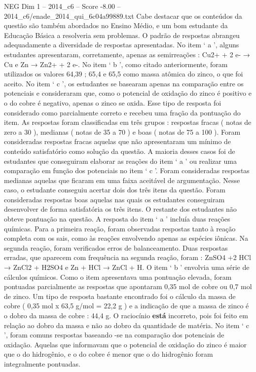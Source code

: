 \begin{textsample}{NEG Dim 1 – 2014\_c6 – Score -8.00 – 2014\_c6/enade\_2014\_qui\_6c04a99889.txt}
Cabe destacar que os conteúdos da questão são também abordados no Ensino Médio, e um bom estudante da Educação Básica a resolveria sem problemas.
O padrão de respostas abrangeu adequadamente a diversidade de respostas apresentadas.
No item ‘ a ’, alguns estudantes apresentaram, corretamente, apenas as semirreações : Cu2+ + 2 e- → Cu e Zn → Zn2+ + 2 e-.
No item ‘ b ’, como citado anteriormente, foram utilizados os valores 64,39 ; 65,4 e 65,5 como massa atômica do zinco, o que foi aceito.
No item ‘ c ’, os estudantes se basearam apenas na comparação entre os potenciais e consideraram que, como o potencial de oxidação do zinco é positivo e o do cobre é negativo, apenas o zinco se oxida.
Esse tipo de resposta foi considerado como parcialmente correto e recebeu uma fração da pontuação do item.
As respostas foram classificadas em três grupos : respostas fracas ( notas de zero a 30 ), medianas ( notas de 35 a 70 ) e boas ( notas de 75 a 100 ).
Foram consideradas respostas fracas aquelas que não apresentaram um mínimo de conteúdo satisfatório como solução da questão.
A maioria desses casos foi de estudantes que conseguiram elaborar as reações do item ‘ a ’ ou realizar uma comparação em função dos potenciais no item ‘ c ’.
Foram consideradas respostas medianas aquelas que ficaram em uma faixa aceitável de argumentação.
Nesse caso, o estudante conseguiu acertar dois dos três itens da questão.
Foram consideradas respostas boas aquelas nas quais os estudantes conseguiram desenvolver de forma satisfatória os três itens.
O restante dos estudantes não obteve pontuação na questão.
A resposta do item ‘ a ’ incluía duas reações químicas.
Para a primeira reação, foram observadas respostas tanto à reação completa com os sais, como às reações envolvendo apenas as espécies iônicas.
Na segunda reação, foram verificados erros de balanceamento.
Duas respostas erradas, que aparecem com frequência na segunda reação, foram : ZnSO4 +2 HCl → ZnCl2 + H2SO4 e Zn + HCl → ZnCl + H.
O item ‘ b ’ envolvia uma série de cálculos químicos.
Como o item apresentava uma pontuação elevada, foram pontuadas parcialmente as respostas que apontaram 0,35 mol de cobre ou 0,7 mol de zinco.
Um tipo de resposta bastante encontrado foi o cálculo da massa de cobre ( 0,35 mol x 63,5 g/mol = 22,2 g ) e a indicação de que a massa de zinco é o dobro da massa de cobre : 44,4 g.
O raciocínio \textbf{está} incorreto, pois foi feito em relação ao dobro da massa e não ao dobro da quantidade de matéria.
No item ‘ c ’, foram comuns respostas baseando -se na comparação dos potenciais de oxidação.
Aquelas que informavam que o potencial de oxidação do zinco é maior que o do hidrogênio, e o do cobre é menor que o do hidrogênio foram integralmente pontuadas.

\end{textsample}
